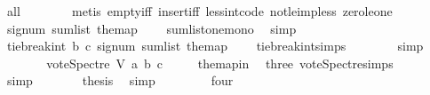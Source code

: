 \begin{isabellebody}
\ all{}{}{\isacharunderscore}{\kern0pt}{}\isanewline
\ \ \ \ \ \ \isamarkupfalse%
\ {\isacharparenleft}{\kern0pt}metis\ empty{\isacharunderscore}{\kern0pt}iff\ insert{\isacharunderscore}{\kern0pt}iff\ less{\isacharunderscore}{\kern0pt}int{\isacharunderscore}{\kern0pt}code{\isacharparenleft}{\kern0pt}{}{\isacharparenright}{\kern0pt}\ not{\isacharunderscore}{\kern0pt}le{\isacharunderscore}{\kern0pt}imp{\isacharunderscore}{\kern0pt}less\ zero{\isacharunderscore}{\kern0pt}le{\isacharunderscore}{\kern0pt}one{\isacharparenright}{\kern0pt}\ \isanewline
\ \ \ \ \isamarkupfalse%
\ \isamarkupfalse%
\ {\isachardoublequoteopen}signum\ {\isacharparenleft}{\kern0pt}sum{\isacharunderscore}{\kern0pt}list\ the{\isacharunderscore}{\kern0pt}map{\isacharparenright}{\kern0pt}\ {\isacharequal}{\kern0pt}\ {}{\isachardoublequoteclose}\ \isamarkupfalse%
\ sumlist{\isacharunderscore}{\kern0pt}one{\isacharunderscore}{\kern0pt}mono\ \isamarkupfalse%
\ simp\isanewline
\ \ \ \ \isamarkupfalse%
\ \isamarkupfalse%
\ {\isachardoublequoteopen}tie{\isacharunderscore}{\kern0pt}break{\isacharunderscore}{\kern0pt}int\ b\ c\ {\isacharparenleft}{\kern0pt}signum\ {\isacharparenleft}{\kern0pt}sum{\isacharunderscore}{\kern0pt}list\ the{\isacharunderscore}{\kern0pt}map{\isacharparenright}{\kern0pt}{\isacharparenright}{\kern0pt}\ {\isacharequal}{\kern0pt}\ {}{\isachardoublequoteclose}\ \isamarkupfalse%
\ tie{\isacharunderscore}{\kern0pt}break{\isacharunderscore}{\kern0pt}int{\isachardot}{\kern0pt}simps\isanewline
\ \ \ \ \ \ \isamarkupfalse%
\ simp\isanewline
\ \ \ \ \isamarkupfalse%
\ \isamarkupfalse%
\ {\isachardoublequoteopen}vote{\isacharunderscore}{\kern0pt}Spectre\ V\ a\ b\ c\ {\isacharequal}{\kern0pt}\ {}\ {\isachardoublequoteclose}\ \isamarkupfalse%
\ the{\isacharunderscore}{\kern0pt}map{\isacharunderscore}{\kern0pt}in\ \isamarkupfalse%
\ three\ vote{\isacharunderscore}{\kern0pt}Spectre{\isachardot}{\kern0pt}simps\isanewline
\ \ \ \ \ \ \isamarkupfalse%
\ simp\isanewline
\ \ \ \ \isamarkupfalse%
\ \isamarkupfalse%
\ {\isacharquery}{\kern0pt}thesis\ \isamarkupfalse%
\ simp\isanewline
\ \ \isamarkupfalse%
\isanewline
\ \ \ \ \isamarkupfalse%
\ four\ \isanewline
\ \ \ \ \isamarkupfalse%

\end{isabellebody}
